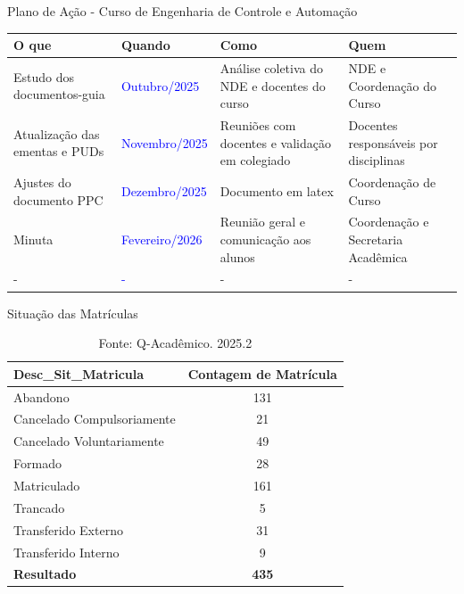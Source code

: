 \begin{frame}{Plano de Ação - Curso de Engenharia de Controle e Automação}
	\centering \scriptsize 
	\renewcommand{\arraystretch}{1.5} %
	\setlength{\tabcolsep}{6pt}       %
	\begin{tabular}{p{3.5cm} p{2.5cm} p{4cm} p{3cm}} 
		\toprule
		\textbf{O que} & \textbf{Quando} & \textbf{Como} & \textbf{Quem} \\
		\midrule
		
		Estudo dos documentos-guia & \textcolor{blue}{Outubro/2025} & Análise coletiva do NDE e docentes do curso & NDE e Coordenação do Curso \\
		
		Atualização das ementas e PUDs & \textcolor{blue}{Novembro/2025} & Reuniões com docentes e validação em colegiado & Docentes responsáveis por disciplinas \\
		
		Ajustes do documento PPC& \textcolor{blue}{Dezembro/2025} & Documento em latex & Coordenação de Curso \\
		
		Minuta & \textcolor{blue}{Fevereiro/2026} & Reunião geral e comunicação aos alunos & Coordenação e Secretaria Acadêmica \\
		
				
		 - & \textcolor{blue}{-} & - & - \\
		\bottomrule
		\bottomrule
	\end{tabular}
\end{frame}


\begin{frame}{Situação das Matrículas}
	\centering
	\renewcommand{\arraystretch}{1.3}
	\setlength{\tabcolsep}{10pt}
	
	\begin{table}[h!]
		\centering
		\caption{Situação geral dos discentes da ECA: 2025.2}
		\begin{tabular}{l|c}
			\hline
			\textbf{Desc\_Sit\_Matricula} & \textbf{Contagem de Matrícula} \\
			\hline
			Abandono & 131 \\
			Cancelado Compulsoriamente & 21 \\
			Cancelado Voluntariamente & 49 \\
			Formado & 28 \\
			Matriculado & 161 \\
			Trancado & 5 \\
			Transferido Externo & 31 \\
			Transferido Interno & 9 \\
			\hline
			\textbf{Resultado} & \textbf{435} \\
			\hline
		\end{tabular}
		\caption*{Fonte: Q-Acadêmico. 2025.2}
	\end{table}
\end{frame}

